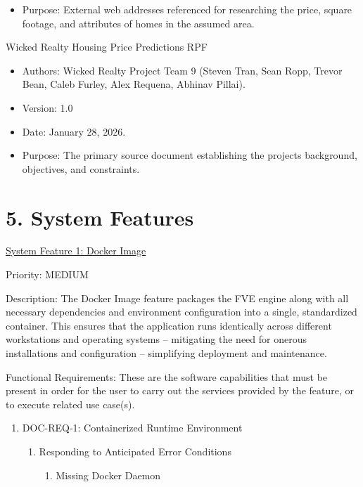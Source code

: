 \documentclass[
]{article}
\begin{document}
\begin{itemize}
\item
  Purpose: External web addresses referenced for researching the price,
  square footage, and attributes of homes in the assumed area.
\end{itemize}

Wicked Realty Housing Price Predictions RPF

\begin{itemize}
\item
  Authors: Wicked Realty Project Team 9 (Steven Tran, Sean Ropp, Trevor
  Bean, Caleb Furley, Alex Requena, Abhinav Pillai).
\item
  Version: 1.0
\item
  Date: January 28, 2026.
\item
  Purpose: The primary source document establishing the
  project\textquotesingle s background, objectives, and constraints.
\end{itemize}

 {}\section{5. System Features}\label{system-features}

\ul{System Feature 1: Docker Image}

Priority: MEDIUM

Description: The Docker Image feature packages the FVE engine along with
all necessary dependencies and environment configuration into a single,
standardized container. This ensures that the application runs
identically across different workstations and operating systems --
mitigating the need for onerous installations and configuration --
simplifying deployment and maintenance.

Functional Requirements: These are the software capabilities that must
be present in order for the user to carry out the services provided by
the feature, or to execute related use case(s).

\begin{enumerate}
\def\labelenumi{\Roman{enumi})}
\item
  DOC-REQ-1: Containerized Runtime Environment

  \begin{enumerate}
  \def\labelenumii{\alph{enumii}.}
  \item
    Responding to Anticipated Error Conditions

    \begin{enumerate}
    \def\labelenumiii{\roman{enumiii}.}
    \item
      Missing Docker Daemon
    \end{enumerate}
  \end{enumerate}
\end{enumerate}
\end{document}
